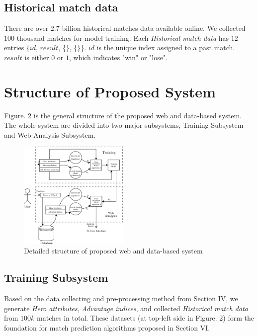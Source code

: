 \documentclass[letterpaper, 10 pt, conference]{ieeeconf}  %
\begin{document}
\subsection{Historical match data}
There are over $2.7$ billion historical matches data available online. We collected $100$ thousand matches for model training. Each \textit{Historical match data} has $12$ entries \{$id$, $result$, \{\}, \{\}\}. $id$ is the unique index assigned to a past match. $result$ is either $0$ or $1$, which indicates "win" or "lose".


\section{Structure of Proposed System}

Figure. 2 is the general structure of the proposed web and data-based system. The whole system are divided into two major subsystems, Training Subsystem and Web-Analysis Subsystem.

\begin{figure}[h]
\begin{center}
\includegraphics[width=0.47\textwidth]{6242big_picture.png}
\caption{Detailed structure of proposed web and data-based system}
\end{center}
\end{figure}

\subsection{Training Subsystem}
Based on the data collecting and pre-processing method from Section IV, we generate \textit{Hero attributes}, \textit{Advantage indices}, and collected \textit{Historical match data} from $100k$ matches in total. These datasets (at top-left side in Figure. 2) form the foundation for match prediction algorithms proposed in Section VI.
\end{document}
